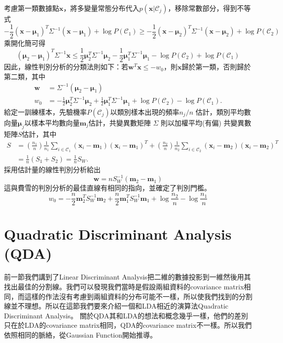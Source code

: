 考慮第一類數據點$\mathbf{x}$，將多變量常態分布代入$p(\mathbf{x}\vert\mathcal{C}_j)$，移除常數部分，得到不等式
$$\displaystyle  -\frac{1}{2}(\mathbf{x}-\boldsymbol{\mu}_1)^T\Sigma^{-1}(\mathbf{x}-\boldsymbol{\mu}_1)+\log P(\mathcal{C}_1)\ge -\frac{1}{2}(\mathbf{x}-\boldsymbol{\mu}_2)^T\Sigma^{-1}(\mathbf{x}-\boldsymbol{\mu}_2)+\log P(\mathcal{C}_2)$$
乘開化簡可得
$$\displaystyle  (\boldsymbol{\mu}_2-\boldsymbol{\mu}_1)^T\Sigma^{-1}\mathbf{x}\le\frac{1}{2}\boldsymbol{\mu}_2^T\Sigma^{-1}\boldsymbol{\mu}_2-\frac{1}{2}\boldsymbol{\mu}_1^T\Sigma^{-1}\boldsymbol{\mu}_1-\log P(\mathcal{C}_2)+\log P(\mathcal{C}_1)$$
因此，線性判別分析的分類法則如下：若$\mathbf{w}^T\mathbf{x}\le -w_0$，則$\mathbf{x}$歸於第一類，否則歸於第二類，其中
$$\displaystyle\begin{aligned}  \mathbf{w}&=\Sigma^{-1}(\boldsymbol{\mu}_2-\boldsymbol{\mu}_1)\\  w_0&=-\frac{1}{2}\boldsymbol{\mu}_2^T\Sigma^{-1}\boldsymbol{\mu}_2+\frac{1}{2}\boldsymbol{\mu}_1^T\Sigma^{-1}\boldsymbol{\mu}_1+\log P(\mathcal{C}_2)-\log P(\mathcal{C}_1).  \end{aligned}$$
給定一訓練樣本，先驗機率$P(\mathcal{C}_j)$以類別樣本出現的頻率$n_j/n$ 估計，類別平均數向量$\boldsymbol{\mu}_j$以樣本平均數向量$\mathbf{m}_j$估計，共變異數矩陣 $\Sigma$ 則以加權平均(有偏) 共變異數矩陣$S$估計，其中
$$\displaystyle\begin{aligned}  S&=\left(\frac{n_1}{n}\right)\frac{1}{n_1}\sum_{i\in\mathcal{C}_1}(\mathbf{x}_i-\mathbf{m}_1)(\mathbf{x}_i-\mathbf{m}_1)^T+\left(\frac{n_2}{n}\right)\frac{1}{n_2}\sum_{i\in\mathcal{C}_2}(\mathbf{x}_i-\mathbf{m}_2)(\mathbf{x}_i-\mathbf{m}_2)^T\\  &=\frac{1}{n}(S_1+S_2)=\frac{1}{n}S_W.\end{aligned}$$
採用估計量的線性判別分析給出
$$\displaystyle  \mathbf{w}=nS_W^{-1}(\mathbf{m}_2-\mathbf{m}_1)$$
這與費雪的判別分析的最佳直線有相同的指向，並確定了判別門檻。
$$\displaystyle  w_0=-\frac{n}{2}\mathbf{m}_2^TS_W^{-1}\mathbf{m}_2+\frac{n}{2}\mathbf{m}_1^TS_W^{-1}\mathbf{m}_1+\log \frac{n_2}{n}-\log \frac{n_1}{n}$$
 

\section{Quadratic Discriminant Analysis (QDA)}
前一節我們講到了Linear Discriminant Analysis把二維的數據投影到一維然後用其找出最佳的分割線。我們可以發現我們當時是假設兩組資料的covariance matrix相同，而這樣的作法沒有考慮到兩組資料的分布可能不一樣，所以使我們找到的分割線並不理想。所以在這節我們要來介紹一個和LDA相近的演算法Quadratic Discriminant Analysis。
關於QDA其和LDA的想法和概念幾乎一樣，他們的差別只在於LDA的covariance matrix相同，QDA的covariance matrix不一樣。所以我們依照相同的脈絡，從Gaussian Function開始推導。

